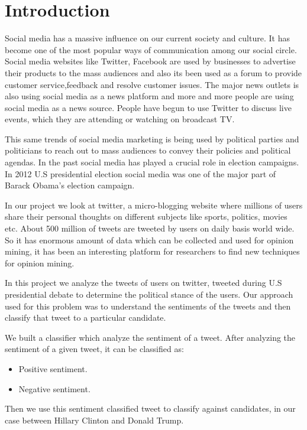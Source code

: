 \documentclass{acm_proc_article-sp}
\begin{document}
\section{Introduction}
Social media has a massive influence on our current society and culture. It has become one of the most popular ways of communication among our social circle. Social media websites like Twitter, Facebook are used by businesses to advertise  their products to the mass audiences and also its been used as a forum to provide customer service,feedback and resolve customer issues.\cite{jenny:wihsmthos} The major news outlets is also using social media as a news platform and more and more people are using social media as a news source. People have
begun to use Twitter to discuss live events, which they are attending or watching on broadcast TV.

This same trends of social media marketing is being used by political parties and politicians to reach out to mass audiences to convey their policies and political agendas. In the past social media has played a crucial role in election campaigns. In 2012 U.S presidential election social media was one of the major part of Barack Obama's election campaign.

In our project we look at twitter, a micro-blogging website where millions of users share their personal thoughts on different subjects like sports, politics, movies etc. About 500 million of tweets are tweeted by users on daily basis world wide. So it has enormous amount of data which can be collected and used for opinion mining, it has been an interesting platform for researchers to find new techniques for opinion mining.

In this project we analyze the tweets of users on twitter, tweeted during U.S presidential debate to determine the political stance of the users. Our approach used for this problem was to understand the sentiments of the tweets and then classify that tweet to a particular candidate.

We built a classifier which analyze the sentiment of a tweet. After analyzing the sentiment of a given tweet, it can be classified as:
\begin{itemize}
\item Positive sentiment.
\item Negative sentiment.
\end{itemize}

Then we use this sentiment classified tweet to classify against candidates, in our case between Hillary Clinton and Donald Trump.
\end{document}
